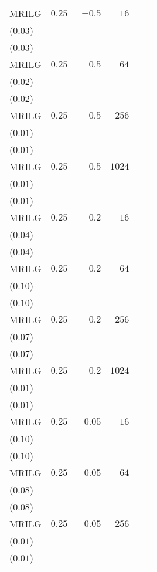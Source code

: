 \begin{table}[t]
\begin{tabular}{lrrrrr}
MRILG & \(0.25\) & \(-0.5\) & \(16\) & \longcell{\(0.25\)\\{\tiny(\(0.03\))}} & \longcell{\(0.25\)\\{\tiny(\(0.03\))}} \\[2.2ex]
MRILG & \(0.25\) & \(-0.5\) & \(64\) & \longcell{\(0.26\)\\{\tiny(\(0.02\))}} & \longcell{\(0.26\)\\{\tiny(\(0.02\))}} \\[2.2ex]
MRILG & \(0.25\) & \(-0.5\) & \(256\) & \longcell{\(0.23\)\\{\tiny(\(0.01\))}} & \longcell{\(0.23\)\\{\tiny(\(0.01\))}} \\[2.2ex]
MRILG & \(0.25\) & \(-0.5\) & \(1024\) & \longcell{\(0.20\)\\{\tiny(\(0.01\))}} & \longcell{\(0.20\)\\{\tiny(\(0.01\))}} \\[2.2ex]
MRILG & \(0.25\) & \(-0.2\) & \(16\) & \longcell{\(0.27\)\\{\tiny(\(0.04\))}} & \longcell{\(0.28\)\\{\tiny(\(0.04\))}} \\[2.2ex]
MRILG & \(0.25\) & \(-0.2\) & \(64\) & \longcell{\(0.18\)\\{\tiny(\(0.10\))}} & \longcell{\(0.18\)\\{\tiny(\(0.10\))}} \\[2.2ex]
MRILG & \(0.25\) & \(-0.2\) & \(256\) & \longcell{\(0.20\)\\{\tiny(\(0.07\))}} & \longcell{\(0.20\)\\{\tiny(\(0.07\))}} \\[2.2ex]
MRILG & \(0.25\) & \(-0.2\) & \(1024\) & \longcell{\(0.20\)\\{\tiny(\(0.01\))}} & \longcell{\(0.20\)\\{\tiny(\(0.01\))}} \\[2.2ex]
MRILG & \(0.25\) & \(-0.05\) & \(16\) & \longcell{\(0.19\)\\{\tiny(\(0.10\))}} & \longcell{\(0.19\)\\{\tiny(\(0.10\))}} \\[2.2ex]
MRILG & \(0.25\) & \(-0.05\) & \(64\) & \longcell{\(0.21\)\\{\tiny(\(0.08\))}} & \longcell{\(0.21\)\\{\tiny(\(0.08\))}} \\[2.2ex]
MRILG & \(0.25\) & \(-0.05\) & \(256\) & \longcell{\(0.22\)\\{\tiny(\(0.01\))}} & \longcell{\(0.22\)\\{\tiny(\(0.01\))}} \\[2.2ex]

\end{tabular}
\end{table}

